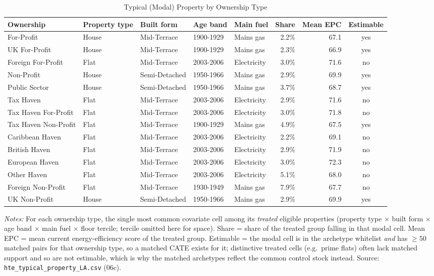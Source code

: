 \begin{table}[htbp]
\centering
\caption{Typical (Modal) Property by Ownership Type}
\label{tab:hte_typical_property}
\scriptsize
\begin{tabular}{lllllrrc}
\toprule
Ownership & Property type & Built form & Age band & Main fuel & Share & Mean EPC & Estimable \\
\midrule
For-Profit & House & Mid-Terrace & 1900-1929 & Mains gas & 2.2\% & 67.1 & yes \\
UK For-Profit & House & Mid-Terrace & 1900-1929 & Mains gas & 2.3\% & 66.9 & yes \\
Foreign For-Profit & Flat & Mid-Terrace & 2003-2006 & Electricity & 3.0\% & 71.6 & no \\
Non-Profit & House & Semi-Detached & 1950-1966 & Mains gas & 2.9\% & 69.9 & yes \\
Public Sector & House & Semi-Detached & 1950-1966 & Mains gas & 3.7\% & 68.7 & yes \\
Tax Haven & Flat & Mid-Terrace & 2003-2006 & Electricity & 2.9\% & 71.6 & no \\
Tax Haven For-Profit & Flat & Mid-Terrace & 2003-2006 & Electricity & 3.0\% & 71.8 & no \\
Tax Haven Non-Profit & Flat & Mid-Terrace & 1900-1929 & Mains gas & 4.9\% & 67.5 & yes \\
Caribbean Haven & Flat & Mid-Terrace & 2003-2006 & Electricity & 2.2\% & 69.1 & no \\
British Haven & Flat & Mid-Terrace & 2003-2006 & Electricity & 2.9\% & 71.9 & no \\
European Haven & Flat & Mid-Terrace & 2003-2006 & Electricity & 3.0\% & 72.3 & no \\
Other Haven & Flat & Mid-Terrace & 2003-2006 & Electricity & 5.1\% & 68.0 & no \\
Foreign Non-Profit & Flat & Mid-Terrace & 1930-1949 & Mains gas & 7.9\% & 67.7 & no \\
UK Non-Profit & House & Semi-Detached & 1950-1966 & Mains gas & 2.9\% & 69.9 & yes \\
\bottomrule
\end{tabular}
\begin{minipage}{0.95\textwidth}
\vspace{4pt}
\footnotesize
\textit{Notes:} For each ownership type, the single most common covariate cell among
its \emph{treated} eligible properties (property type $\times$ built form $\times$ age
band $\times$ main fuel $\times$ floor tercile; tercile omitted here for space).
Share = share of the treated group falling in that modal cell. Mean EPC = mean current
energy-efficiency score of the treated group. Estimable = the modal cell is in the
archetype whitelist \emph{and} has $\geq 50$ matched pairs for that ownership type, so a
matched CATE exists for it; distinctive treated cells (e.g.\ prime flats) often lack
matched support and so are not estimable, which is why the matched archetypes reflect
the common control stock instead. Source: \texttt{hte\_typical\_property\_LA.csv} (06c).
\end{minipage}
\end{table}
